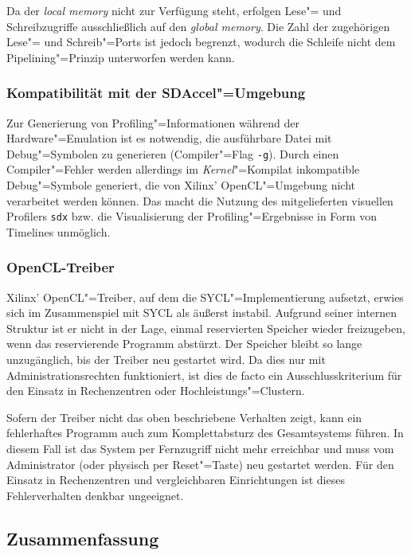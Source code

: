 Da der \textit{local memory} nicht zur Verfügung steht, erfolgen Lese"= und
Schreibzugriffe ausschließlich auf den \textit{global memory}. Die Zahl der
zugehörigen Lese"= und Schreib"=Ports ist jedoch begrenzt, wodurch die Schleife
nicht dem Pipelining"=Prinzip unterworfen werden kann.

\subsubsection{Kompatibilität mit der SDAccel"=Umgebung}

Zur Generierung von Profiling"=Informationen während der Hardware"=Emulation ist
es notwendig, die ausführbare Datei mit Debug"=Symbolen zu generieren
(Compiler"=Flag \texttt{-g}). Durch einen Compiler"=Fehler werden allerdings im
\textit{Kernel}"=Kompilat inkompatible Debug"=Symbole generiert, die von Xilinx'
OpenCL"=Umgebung nicht verarbeitet werden können. Das macht die Nutzung des
mitgelieferten visuellen Profilers \texttt{sdx} bzw. die Visualisierung der
Profiling"=Ergebnisse in Form von Timelines unmöglich.

\subsubsection{OpenCL-Treiber}

Xilinx' OpenCL"=Treiber, auf dem die SYCL"=Implementierung aufsetzt, erwies sich
im Zusammenspiel mit SYCL als äußerst instabil. Aufgrund seiner internen
Struktur ist er nicht in der Lage, einmal reservierten Speicher wieder
freizugeben, wenn das reservierende Programm abstürzt. Der Speicher bleibt so
lange unzugänglich, bis der Treiber neu gestartet wird. Da dies nur mit
Administrationsrechten funktioniert, ist dies de facto ein Ausschlusskriterium
für den Einsatz in Rechenzentren oder Hochleistungs"=Clustern.

Sofern der Treiber nicht das oben beschriebene Verhalten zeigt, kann ein
fehlerhaftes Programm auch zum Komplettabsturz des Gesamtsystems führen. In
diesem Fall ist das System per Fernzugriff nicht mehr erreichbar und muss
vom Administrator (oder physisch per Reset"=Taste) neu gestartet werden. Für den
Einsatz in Rechenzentren und vergleichbaren Einrichtungen ist dieses
Fehlerverhalten denkbar ungeeignet.

\subsection{Zusammenfassung}
 
